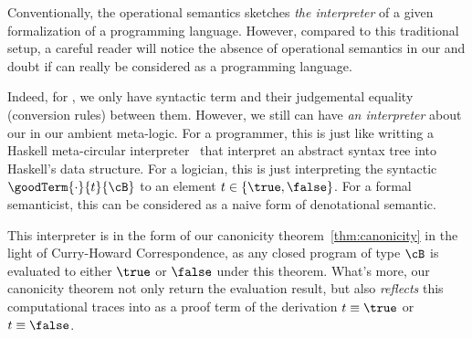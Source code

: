   Conventionally, the operational semantics sketches \emph{the interpreter} of a given formalization of a programming language. However, compared to this traditional setup, a careful reader will notice the absence of operational semantics in our \TT and doubt if \TT can really be considered as a programming language.

Indeed, for \TT, we only have syntactic term and their judgemental equality (conversion rules) between them. However, we still can have \emph{an interpreter} about our \TT in our ambient meta-logic. For a programmer, this is just like writting a Haskell meta-circular interpreter~\cite{abelson1996structure} that interpret an abstract syntax tree into Haskell's data structure. For a logician, this is just interpreting the syntactic $\goodTerm{\cdot}{t}{\cB}$ to an element $t \in \{\true, \false \}$. For a formal semanticist, this can be considered as a naive form of denotational semantic. 

This interpreter is in the form of our canonicity theorem~\cref{thm:canonicity} in the light of Curry-Howard Correspondence, as any closed program of type $\cB$ is evaluated to either $\true$ or $\false$ under this theorem.
What's more, our canonicity theorem not only return the evaluation result, but also \emph{reflects} this computational traces into \TT as a proof term of the derivation $t \equiv \true$ or $t \equiv \false$.  
